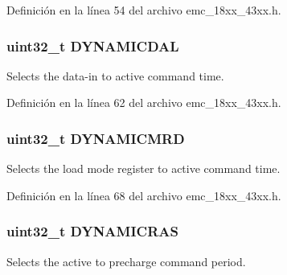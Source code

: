 Definición en la línea 54 del archivo emc\+\_\+18xx\+\_\+43xx.\+h.

\subsubsection[{\texorpdfstring{D\+Y\+N\+A\+M\+I\+C\+D\+AL}{DYNAMICDAL}}]{ uint32\+\_\+t D\+Y\+N\+A\+M\+I\+C\+D\+AL}\hypertarget{struct_l_p_c___e_m_c___t_a8256b6fc7c874e73de98b147f187b240}{}\label{struct_l_p_c___e_m_c___t_a8256b6fc7c874e73de98b147f187b240}
Selects the data-\/in to active command time. 

Definición en la línea 62 del archivo emc\+\_\+18xx\+\_\+43xx.\+h.

\subsubsection[{\texorpdfstring{D\+Y\+N\+A\+M\+I\+C\+M\+RD}{DYNAMICMRD}}]{ uint32\+\_\+t D\+Y\+N\+A\+M\+I\+C\+M\+RD}\hypertarget{struct_l_p_c___e_m_c___t_a5c6efae0a5430be118811efb2f69e5d3}{}\label{struct_l_p_c___e_m_c___t_a5c6efae0a5430be118811efb2f69e5d3}
Selects the load mode register to active command time. 

Definición en la línea 68 del archivo emc\+\_\+18xx\+\_\+43xx.\+h.

\subsubsection[{\texorpdfstring{D\+Y\+N\+A\+M\+I\+C\+R\+AS}{DYNAMICRAS}}]{ uint32\+\_\+t D\+Y\+N\+A\+M\+I\+C\+R\+AS}\hypertarget{struct_l_p_c___e_m_c___t_a0a688dd94c04d7c6fd3bdd10af958e54}{}\label{struct_l_p_c___e_m_c___t_a0a688dd94c04d7c6fd3bdd10af958e54}
Selects the active to precharge command period. 


